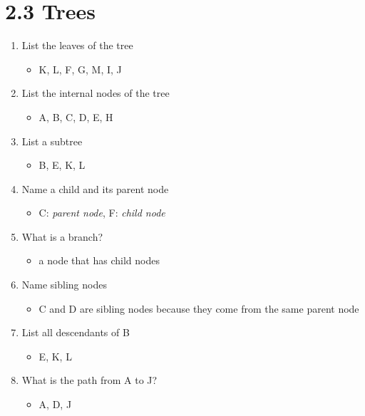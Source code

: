 \documentclass[11pt]{article}
\begin{document}
\section*{2.3 Trees}
\begin{enumerate}
    \item List the leaves of the tree
    \begin{itemize}
        \item K, L, F, G, M, I, J
    \end{itemize}
    
    \item List the internal nodes of the tree
    \begin{itemize}
        \item A, B, C, D, E, H
    \end{itemize}
    
    \item List a subtree
    \begin{itemize}
        \item B, E, K, L
    \end{itemize}
    
    \item Name a child and its parent node
    \begin{itemize}
        \item C: \textit{parent node}, F: \textit{child node}
    \end{itemize}
    
    \item What is a branch?
    \begin{itemize}
        \item  a node that has child nodes
    \end{itemize}
    
    \item Name sibling nodes
    \begin{itemize}
        \item C and D are sibling nodes because they come from the same parent node
    \end{itemize}
    
    \item List all descendants of B
    \begin{itemize}
        \item E, K, L
    \end{itemize}
    
    \item What is the path from A to J?
    \begin{itemize}
        \item A, D, J
    \end{itemize}
    

\end{enumerate}
\end{document}
